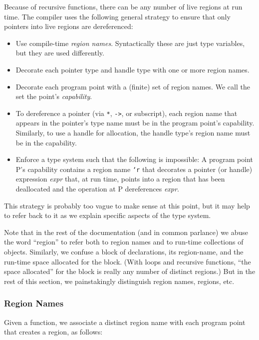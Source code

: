 Because of recursive functions, there can be any number of live
regions at run time.  The compiler uses the following general strategy to
ensure that only pointers into live regions are dereferenced:

\begin{itemize}
\item Use compile-time \emph{region names}.  Syntactically these are
  just type variables, but they are used differently.
\item Decorate each pointer type and handle type with one or more region names. 
\item Decorate each program point with a (finite) set of region names.
  We call the set the point's \emph{capability}.
\item To dereference a pointer (via \texttt{*}, \texttt{->}, or
  subscript), each region name that appears in the pointer's type name
  must be in the program point's capability.  Similarly, to use a
  handle for allocation, the handle type's region name must be in the
  capability.
\item Enforce a type system such that the following is impossible: A
  program point P's capability contains a region name \texttt{`r} that
  decorates a pointer (or handle) expression \textit{expr} that, at
  run time, points into a region that has been deallocated and the
  operation at P dereferences \textit{expr}.
\end{itemize}

This strategy is probably too vague to make sense at this point, but
it may help to refer back to it as we explain specific aspects of the
type system.

Note that in the rest of the documentation (and in common parlance) we
abuse the word ``region'' to refer both to region names and to
run-time collections of objects.  Similarly, we confuse a block of
declarations, its region-name, and the run-time space allocated for
the block.  (With loops and recursive functions, ``the space
allocated'' for the block is really any number of distinct regions.)
But in the rest of this section, we painstakingly distinguish
region names, regions, etc.

\subsubsection{Region Names}

Given a function, we associate a distinct region name with each
program point that creates a region, as follows:

